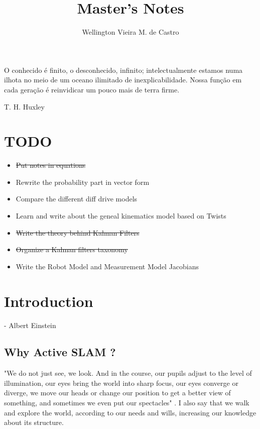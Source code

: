 \documentclass[12pt]{article}
\title{Master's Notes}
\author{Wellington Vieira M. de Castro }
\begin{document}
\maketitle

\begin{displayquote}
O conhecido é finito, o desconhecido, infinito; intelectualmente estamos numa ilhota no meio de um oceano ilimitado de inexplicabilidade. Nossa função em cada geração é reinvidicar um pouco mais de terra firme.
\end{displayquote}
\begin{flushright}
T. H. Huxley
\end{flushright}

\color{magenta}
\section*{TODO}
\begin{itemize}
    \item \sout{Put notes in equations}
    \item Rewrite the probability part in vector form
    \item Compare the different diff drive models
    \item Learn and write about the geneal kinematics model based on Twists
    \item \sout{Write the theory behind Kalman Filters}
    \item \sout{Organize a Kalman filters taxonomy}
    \item Write the Robot Model and Measurement Model Jacobians
\end{itemize}
\color{black}

\tableofcontents

\section{Introduction}
 - Albert Einstein

\subsection{Why Active SLAM ?}
"We do not just see, we look. And in the course, our pupils adjust to the level of illumination, our eyes bring the world into sharp focus, our eyes converge or diverge, we move our heads or change our position to get a better view of something, and sometimes we even put our spectacles" \cite{bajcsy1988active}. I also say that we walk and explore the world, according to our needs and wills, increasing our knowledge about its structure.
\end{document}
